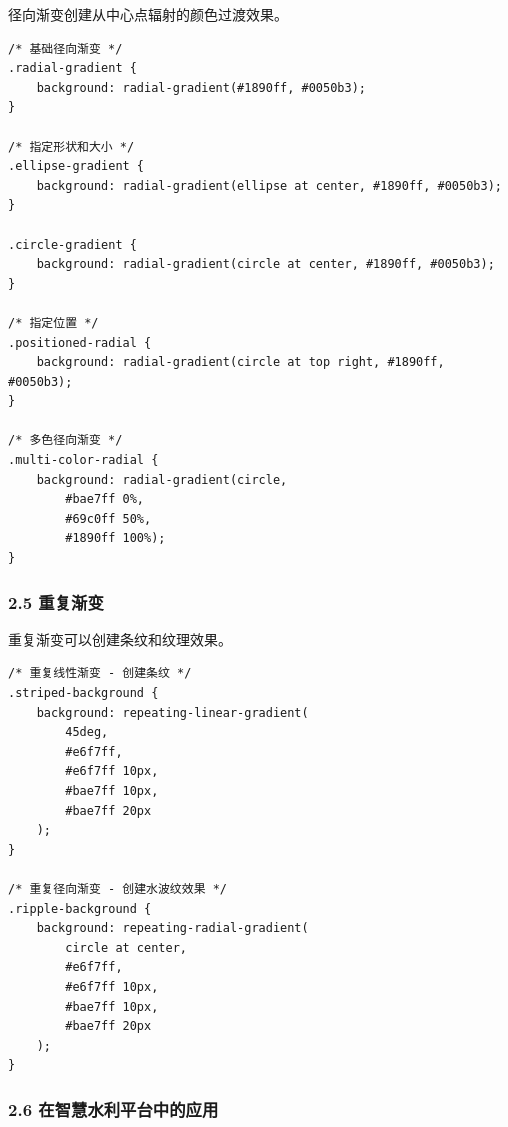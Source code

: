 径向渐变创建从中心点辐射的颜色过渡效果。

\begin{lstlisting}
/* 基础径向渐变 */
.radial-gradient {
    background: radial-gradient(#1890ff, #0050b3);
}

/* 指定形状和大小 */
.ellipse-gradient {
    background: radial-gradient(ellipse at center, #1890ff, #0050b3);
}

.circle-gradient {
    background: radial-gradient(circle at center, #1890ff, #0050b3);
}

/* 指定位置 */
.positioned-radial {
    background: radial-gradient(circle at top right, #1890ff, #0050b3);
}

/* 多色径向渐变 */
.multi-color-radial {
    background: radial-gradient(circle,
        #bae7ff 0%,
        #69c0ff 50%,
        #1890ff 100%);
}
\end{lstlisting}

\subsubsection{2.5 重复渐变}\label{ux91cdux590dux6e10ux53d8}

重复渐变可以创建条纹和纹理效果。

\begin{lstlisting}
/* 重复线性渐变 - 创建条纹 */
.striped-background {
    background: repeating-linear-gradient(
        45deg,
        #e6f7ff,
        #e6f7ff 10px,
        #bae7ff 10px,
        #bae7ff 20px
    );
}

/* 重复径向渐变 - 创建水波纹效果 */
.ripple-background {
    background: repeating-radial-gradient(
        circle at center,
        #e6f7ff,
        #e6f7ff 10px,
        #bae7ff 10px,
        #bae7ff 20px
    );
}
\end{lstlisting}

\subsubsection{2.6
在智慧水利平台中的应用}\label{ux5728ux667aux6167ux6c34ux5229ux5e73ux53f0ux4e2dux7684ux5e94ux7528-3}

